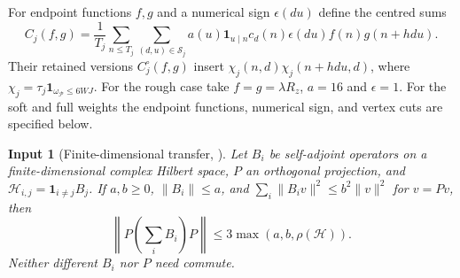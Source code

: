 \documentclass[11pt]{article}
\newtheorem{inputthm}[theorem]{Input}
\theoremstyle{definition}
\newcommand{\ind}{\mathbf 1}
\newcommand{\Pset}{\mathcal P}
\theoremstyle{remark}
\numberwithin{equation}{section}
\begin{document}
For endpoint functions $f,g$ and a numerical sign $\epsilon(du)$ define the centred sums
\begin{equation}\label{eq:centered-sums}
 C_j(f,g)=\frac1{T_j}\sum_{n\le T_j}\sum_{(d,u)\in\mathcal S_j}
 a(u)\ind_{u\mid n}c_d(n)\epsilon(du)f(n)g(n+hdu).
\end{equation}
Their retained versions $C_j^\circ(f,g)$ insert $\chi_j(n,d)\chi_j(n+hdu,d)$, where
$\chi_j=\tau_j\ind_{\omega_{\Pset}\le6WJ}$.
For the rough case take $f=g=\lambda R_z$, $a=16$ and $\epsilon=1$.
For the soft and full weights the endpoint functions, numerical sign, and vertex cuts are specified below.

\begin{inputthm}[Finite-dimensional transfer, {\cite[Lemma~8.1, p.~39]{OpenAI007}}]\label{input:transfer}
Let $B_i$ be self-adjoint operators on a finite-dimensional complex Hilbert space, $P$ an orthogonal projection,
and $\mathcal H_{i,j}=\ind_{i\ne j}B_j$. If $a,b\ge0$, $\|B_i\|\le a$, and
$\sum_i\|B_iv\|^2\le b^2\|v\|^2$ for $v=Pv$, then
\begin{equation}\label{eq:transfer}
 \left\|P\left(\sum_iB_i\right)P\right\|\le3\max(a,b,\rho(\mathcal H)).
\end{equation}
Neither different $B_i$ nor $P$ need commute.
\end{inputthm}
\end{document}
